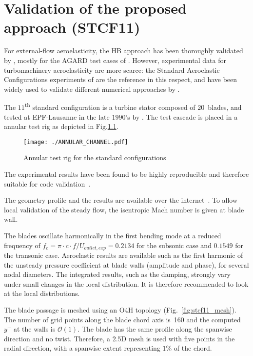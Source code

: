 
\chapter{Validation of the proposed approach (STCF11)} %
\label{cha:validation_of_the_proposed_approach}


For external-flow aeroelasticity, the HB approach has 
been thoroughly 
validated by \citet{Gopinath2005, Sicot2008, Woodgate2009, Dufour2010}, 
mostly for the AGARD test cases of \citet{Davis1982}. 
However, experimental data for turbomachinery aeroelasticity are more scarce: 
the Standard Aeroelastic Configurations experiments 
of \citet{Fransson:1999uq} are the 
reference in this respect, and have been widely used 
to validate different numerical approaches by \citet{Sbardella:2001fk,
Duta:2002uq,Campobasso:2003fk,Cinnella2004,mcbean2005}. 

The $11$\textsuperscript{th} standard configuration is a
turbine stator composed of $20$~blades, and tested at EPF-Lausanne
in the late $1990$'s by \citet{Fransson:1999uq}.
The test cascade is placed in a 
annular test rig as depicted in Fig.\ref{fig:annular_channel}.
\begin{figure}[htbp]
  \centering
  \texttt{[image: ./ANNULAR\_CHANNEL.pdf]}
  \caption{Annular test rig for the standard configurations}
  \label{fig:annular_channel}
\end{figure}
The experimental results have been found to be highly reproducible and
therefore suitable for code validation~\cite{Fransson:1999uq}.  

The geometry profile and the results are available over the
internet~\cite{stcf11web}.  To allow local validation of the steady
flow, the isentropic Mach number is given at blade wall.

The blades oscillate harmonically in the first bending mode
at a reduced frequency of $f_{c} =\pi \cdot c \cdot
f/U_{outlet, exp} = 0.2134$ for the subsonic case and $0.1549$ for the
transonic case. Aeroelastic
results are available such as the first harmonic of the unsteady pressure
coefficient at blade walls (amplitude and phase), for several nodal
diameters. The integrated
results, such as the damping, strongly vary under small changes in the
local distribution. It is therefore recommended to look at the local
distributions.
 
The blade passage is meshed using an O4H topology (Fig.~\ref{fig:stcf11_mesh}).  
The number of grid points along the blade
chord axis is~160 and the computed $y^+$ at the walls is $\mathcal{O}(1)$. %
The blade has the same profile along the spanwise direction and no
twist. Therefore, a 2.5D mesh is used with five points in the radial direction, with a spanwise
extent representing $1\%$ of the chord. 

